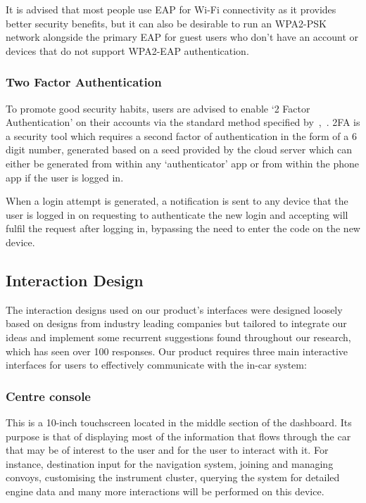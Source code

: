 \documentclass{article}
\begin{document}
\noindent It is advised that most people use EAP for Wi-Fi connectivity as it provides better security benefits, but it can also be desirable to run an WPA2-PSK network alongside the primary EAP for guest users who don't have an account or devices that do not support WPA2-EAP authentication.

\subsubsection{Two Factor Authentication}
To promote good security habits, users are advised to enable `2 Factor Authentication' on their accounts via the standard method specified by~\textcite{rfc6238},~. 2FA is a security tool which requires a second factor of authentication in the form of a 6 digit number, generated based on a seed provided by the cloud server which can either be generated from within any `authenticator' app or from within the phone app if the user is logged in.

When a login attempt is generated, a notification is sent to any device that the user is logged in on requesting to authenticate the new login and accepting will fulfil the request after logging in, bypassing the need to enter the code on the new device.

\subsection{Interaction Design}\label{ssec:interaction-design} %
The interaction designs used on our product's interfaces were designed loosely based on designs from industry leading companies but tailored to integrate our ideas and implement some recurrent suggestions found throughout our research, which has seen over 100 responses. Our product requires three main interactive interfaces for users to effectively communicate with the in-car system:

\subsubsection{Centre console}\label{sssec:centre-console}
This is a 10-inch touchscreen located in the middle section of the dashboard. Its purpose is that of displaying most of the information that flows through the car that may be of interest to the user and for the user to interact with it. For instance, destination input for the navigation system, joining and managing convoys, customising the instrument cluster, querying the system for detailed engine data and many more interactions will be performed on this device.
\end{document}
